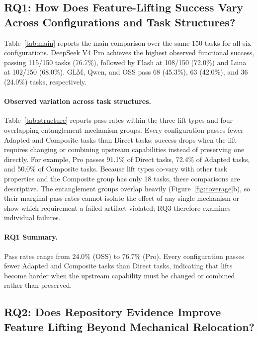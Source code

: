 \documentclass[acmsmall,screen,review,anonymous]{acmart}
\begin{document}
\subsection{RQ1: How Does Feature-Lifting Success Vary Across Configurations and Task Structures?}
\label{sec:rq1}

Table~\ref{tab:main} reports the main comparison over the same 150 tasks for all
six configurations. DeepSeek V4 Pro achieves the highest observed functional
success, passing 115/150 tasks (76.7\%), followed by Flash at 108/150 (72.0\%)
and Luna at 102/150 (68.0\%). GLM, Qwen, and OSS pass 68 (45.3\%), 63 (42.0\%),
and 36 (24.0\%) tasks, respectively.

\paragraph{Observed variation across task structures.}
Table~\ref{tab:structure} reports pass rates within the three lift types
and four overlapping entanglement-mechanism groups. Every configuration passes
fewer Adapted and Composite tasks than Direct tasks: success drops when the lift
requires changing or combining upstream capabilities instead of preserving one
directly. For example, Pro passes 91.1\% of Direct tasks, 72.4\% of Adapted
tasks, and 50.0\% of Composite tasks. Because lift types co-vary with other task
properties and the Composite group has only 18 tasks, these comparisons are
descriptive. The entanglement groups overlap heavily
(Figure~\ref{fig:coverage}b), so their marginal pass rates cannot isolate the
effect of any single mechanism or show which requirement a failed artifact
violated; RQ3 therefore examines individual failures.

\paragraph{RQ1 Summary.}
Pass rates range from 24.0\% (OSS) to 76.7\% (Pro). Every configuration passes
fewer Adapted and Composite tasks than Direct tasks, indicating that lifts
become harder when the upstream capability must be changed or combined rather
than preserved.



\subsection{RQ2: Does Repository Evidence Improve Feature Lifting Beyond Mechanical Relocation?}
\label{sec:rq2}
\label{sec:source-ablation-results}
\end{document}
